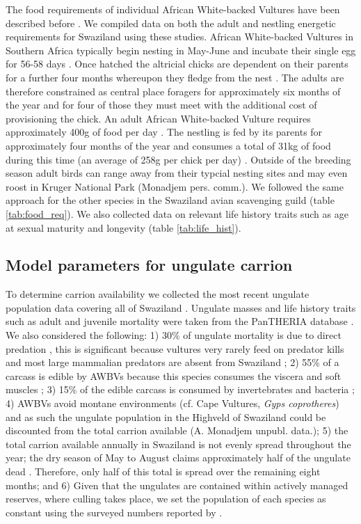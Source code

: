 The food requirements of individual African White-backed Vultures have been described before \citep{houston1976breeding,mundy1992vultures}. We compiled data on both the adult and nestling energetic requirements for Swaziland using these studies. African White-backed Vultures in Southern Africa typically begin nesting in May-June \citep{monadjem2003nesting} and incubate their single egg for 56-58 days \citep{mundy1992vultures}. Once hatched the altricial chicks are dependent on their parents for a further four months whereupon they fledge from the nest \citep{mundy1992vultures}. The adults are therefore constrained as central place foragers for approximately six months of the year and for four of those they must meet with the additional cost of provisioning the chick. An adult African White-backed Vulture requires approximately 400g of food per day \citep{mundy1992vultures}. The nestling is fed by its parents for approximately four months of the year and consumes a total of 31kg of food during this time (an average of 258g per chick per day) \citep{mundy1992vultures}. Outside of the breeding season adult birds can range away from their typcial nesting sites and may even roost in Kruger National Park (Monadjem pers. comm.). We followed the same approach for the other species in the Swaziland avian scavenging guild (table \ref{tab:food_req}). We also collected data on relevant life history traits such as age at sexual maturity and longevity (table \ref{tab:life_hist}).

\subsection{Model parameters for ungulate carrion}
To determine carrion availability we collected the most recent ungulate population data covering all of Swaziland \citep{monadjem2003threatened}. Ungulate masses and life history traits such as adult and juvenile mortality were taken from the PanTHERIA database \citep{jones2009pantheria}. We also considered the following: 1) 30\% of ungulate mortality is due to direct predation \citep{sinclair1995serengeti}, this is significant because vultures very rarely feed on predator kills and most large mammalian predators are absent from Swaziland \citep{houston1974food,monadjem2003threatened}; 2) 55\% of a carcass is edible by AWBVs \citep{sinclair1995serengeti} because this species consumes the viscera and soft muscles  \citep{kruuk1967competition}; 3) 15\% of the edible carcass is consumed by invertebrates and bacteria \citep{sinclair1995serengeti}; 4) AWBVs avoid montane environments (cf. Cape Vultures, \textit {Gyps coprotheres}) and as such the ungulate population in the Highveld of Swaziland could be discounted from the total carrion available (A. Monadjem unpubl. data.); 5) the total carrion available annually in Swaziland is not evenly spread throughout the year; the dry season of May to August claims approximately half of the ungulate dead \citep{sinclair1995serengeti}. Therefore, only half of this total is spread over the remaining eight months; and 6) Given that the ungulates are contained within actively managed reserves, where culling takes place, we set the population of each species as constant using the surveyed numbers reported by \cite{monadjem2003threatened}.


